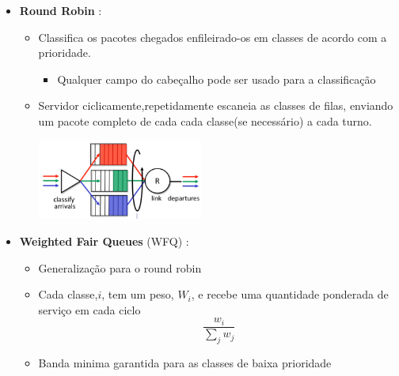\begin{itemize}[left=0.5cm, align=left, nosep]
                \item \textbf{Round Robin} :
                    \begin{itemize}[left=0.5cm, nosep, label=$\hookrightarrow$] 
                        \item Classifica os pacotes chegados enfileirado-os em classes de acordo com a prioridade. 
                        \begin{itemize}[left=0.5cm, nosep, label=$-$]
                            \item Qualquer campo do cabeçalho pode ser usado para a classificação
                        \end{itemize}      
                        
                        \item Servidor ciclicamente,repetidamente escaneia as classes de filas, enviando um pacote completo de cada cada classe(se necessário) a cada turno. 
                    
                        \begin{center}
                            \includegraphics[width=0.45\textwidth]{img/cap-04/round-robin.png}
                        \end{center}
                    
                    \end{itemize}

                \item \textbf{Weighted Fair Queues} (WFQ) :
                    \begin{itemize}[left=0.5cm, nosep, label=$\hookrightarrow$]
                        \item Generalização para o round robin
                        \item Cada classe,$i$, tem um peso, $W_i$, e recebe uma quantidade ponderada de serviço em cada ciclo
                        \[
                            \frac{w_i}{\sum_{j}^{} w_j}  
                        \]  
                        \item Banda minima garantida para as classes de baixa prioridade 
                         
                    \end{itemize}    
                     

\end{itemize}
